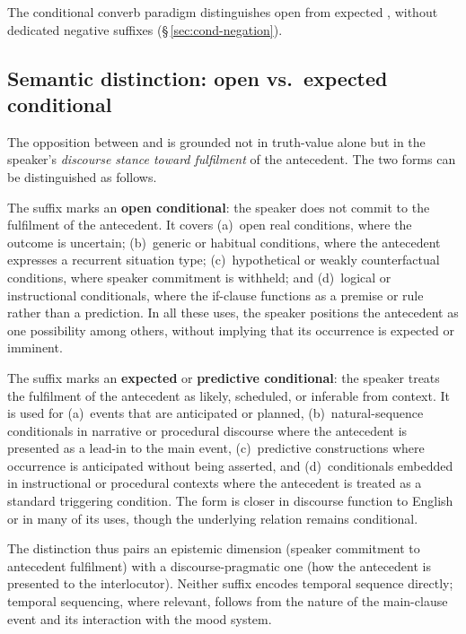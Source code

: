 The conditional converb paradigm distinguishes open  from expected
, without dedicated negative suffixes
(§\,\ref{sec:cond-negation}).

\subsection{Semantic distinction: open vs.\ expected conditional}
\label{sec:cond-semantics}

The opposition between  and  is grounded not in truth-value
alone but in the speaker's \emph{discourse stance toward fulfilment} of the
antecedent. The two forms can be distinguished as follows.

The suffix  marks an \textbf{open conditional}: the speaker does not
commit to the fulfilment of the antecedent. It covers (a)~open real conditions,
where the outcome is uncertain; (b)~generic or habitual conditions,
where the antecedent expresses a recurrent situation type; (c)~hypothetical or
weakly counterfactual conditions, where speaker commitment is withheld; and
(d)~logical or instructional conditionals, where the if-clause functions as a
premise or rule rather than a prediction. In all these uses, the speaker
positions the antecedent as one possibility among others, without implying that
its occurrence is expected or imminent.

The suffix  marks an \textbf{expected} or \textbf{predictive
conditional}: the speaker treats the fulfilment of the antecedent as likely,
scheduled, or inferable from context. It is used for (a)~events that are
anticipated or planned, (b)~natural-sequence conditionals in narrative or
procedural discourse where the antecedent is presented as a lead-in to the main
event, (c)~predictive  constructions where occurrence is
anticipated without being asserted, and (d)~conditionals embedded in instructional
or procedural contexts where the antecedent is treated as a standard triggering
condition. The form is closer in discourse function to English  or
 in many of its uses, though the underlying relation remains
conditional.

The distinction thus pairs an epistemic dimension (speaker commitment to
antecedent fulfilment) with a discourse-pragmatic one (how the antecedent is
presented to the interlocutor). Neither suffix encodes temporal sequence
directly; temporal sequencing, where relevant, follows from the nature of the
main-clause event and its interaction with the mood system.


